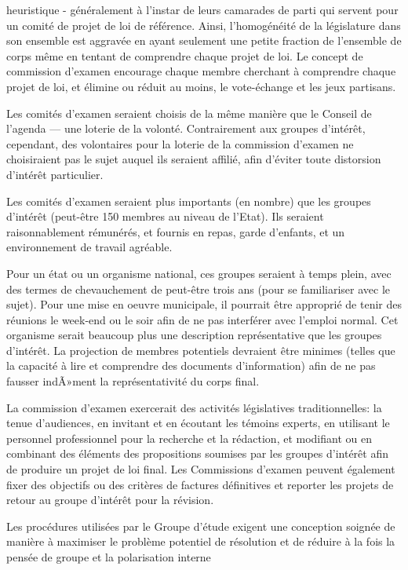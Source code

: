 heuristique - généralement à l'instar de leurs camarades de parti qui
servent pour un comité de projet de loi de référence. Ainsi,
l'homogénéité de la législature dans son ensemble est aggravée en
ayant seulement une petite fraction de l'ensemble de corps même en
tentant de comprendre chaque projet de loi. Le concept de commission
d'examen encourage chaque membre cherchant à comprendre chaque projet
de loi, et élimine ou réduit au moins, le vote-échange et les jeux
partisans.\par
Les comités d'examen seraient choisis de la même manière que le Conseil
de l'agenda --- une loterie de la volonté. Contrairement  aux
groupes d'intérêt, cependant, des volontaires pour la loterie de la
commission d'examen ne choisiraient pas le sujet auquel ils seraient
affilié, afin d'éviter toute distorsion d'intérêt particulier. \par
Les comités d'examen seraient plus importants (en nombre) que les
groupes d'intérêt (peut-être 150 membres au niveau de l'Etat). Ils
seraient raisonnablement rémunérés, et fournis en repas, garde
d'enfants, et un environnement de travail agréable. \par
Pour un état ou un organisme national, ces groupes seraient à
temps plein, avec des termes de chevauchement de peut-être trois ans (pour se
familiariser avec le sujet). Pour une mise en oeuvre municipale, il
pourrait être approprié de tenir des réunions le week-end ou le soir
afin de ne pas interférer avec l'emploi normal. Cet organisme serait
beaucoup plus une description représentative que les groupes
d'intérêt. La projection de membres potentiels devraient être minimes
(telles que la capacité à lire et comprendre des documents
d'information) afin de ne pas fausser indÃ»ment la représentativité du
corps final. \par
La commission d'examen exercerait des activités législatives
traditionnelles: la tenue d'audiences, en invitant et en écoutant les
témoins experts, en utilisant le personnel professionnel pour la
recherche et la rédaction, et modifiant ou en combinant des éléments
des propositions soumises par les groupes d'intérêt afin de produire un
projet de loi final. Les Commissions d'examen peuvent également fixer
des objectifs ou des critères de factures définitives et reporter les
projets de retour au groupe d'intérêt pour la révision.\par
Les procédures utilisées par le Groupe d'étude exigent une conception
soignée de manière à maximiser le problème potentiel de résolution et
de réduire à la fois la pensée de groupe et la polarisation interne
